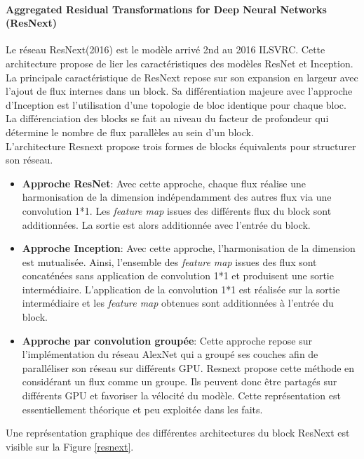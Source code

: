 \paragraph{Aggregated Residual Transformations for Deep Neural Networks (ResNext)}

\noindent Le réseau ResNext\cite{resnext}(2016) est le modèle arrivé 2nd au 2016 ILSVRC. Cette architecture propose de lier les caractéristiques des modèles ResNet et Inception. La principale caractéristique de ResNext repose sur son expansion en largeur avec l'ajout de flux internes dans un block. Sa différentiation majeure avec l'approche d'Inception est l'utilisation d'une topologie de bloc identique pour chaque bloc. La différenciation des blocks se fait au niveau du facteur de profondeur qui détermine le nombre de flux parallèles au sein d'un block.\\

\noindent L'architecture Resnext propose trois formes de blocks équivalents pour structurer son réseau.

\begin{itemize}
    \item \textbf{Approche ResNet}: Avec cette approche, chaque flux réalise une harmonisation de la dimension indépendamment des autres flux via une convolution 1*1. Les \textit{feature map} issues des différents flux du block sont additionnées. La sortie est alors additionnée avec l'entrée du block.

    \item \textbf{Approche Inception}: Avec cette approche, l'harmonisation de la dimension est mutualisée. Ainsi, l'ensemble des \textit{feature map} issues des flux sont concaténées sans application de convolution 1*1 et produisent une sortie intermédiaire. L'application de la convolution 1*1 est réalisée sur la sortie intermédiaire et les \textit{feature map} obtenues sont additionnées à l'entrée du block.

    \item \textbf{Approche par convolution groupée}: Cette approche repose sur l'implémentation du réseau AlexNet qui a groupé ses couches afin de paralléliser son réseau sur différents GPU. Resnext propose cette méthode en considérant un flux comme un groupe. Ils peuvent donc être partagés sur différents GPU et favoriser la vélocité du modèle. Cette représentation est essentiellement théorique et peu exploitée dans les faits.
\end{itemize}

\noindent Une représentation graphique des différentes architectures du block ResNext est visible sur la Figure \ref{resnext}.

